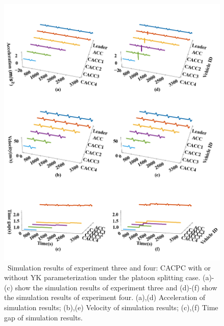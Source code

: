 \documentclass[a4paper,fleqn]{cas-sc}
\begin{document}
\begin{figure}
  \centering
  \includegraphics[width=14cm]{figs/c_split.png}
  \caption{~Simulation results of experiment three and four: CACPC with or without YK parameterization under the platoon splitting case. (a)-(c) show the simulation results of experiment three and (d)-(f) show the simulation results of experiment four. (a),(d) Acceleration of simulation results; (b),(e) Velocity of simulation results; (c),(f) Time gap of simulation results.}
  \label{new3}
\end{figure}
\end{document}
